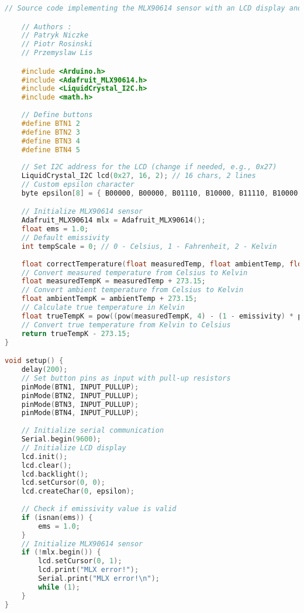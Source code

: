 \begin{lstlisting}[language=C++]
    // Source code implementing the MLX90614 sensor with an LCD display and keypad as a pyrometer using the Arduino platform

    // Authors :
    // Patryk Niczke
    // Piotr Rosinski
    // Przemyslaw Lis

    #include <Arduino.h>
    #include <Adafruit_MLX90614.h>
    #include <LiquidCrystal_I2C.h>
    #include <math.h>
    
    // Define buttons
    #define BTN1 2
    #define BTN2 3
    #define BTN3 4
    #define BTN4 5
    
    // Set I2C address for the LCD (change if needed, e.g., 0x27)
    LiquidCrystal_I2C lcd(0x27, 16, 2); // 16 chars, 2 lines
    // Custom epsilon character
    byte epsilon[8] = { B00000, B00000, B01110, B10000, B11110, B10000, B01110, B00000 };

    // Initialize MLX90614 sensor
    Adafruit_MLX90614 mlx = Adafruit_MLX90614();
    float ems = 1.0;
    // Default emissivity
    int tempScale = 0; // 0 - Celsius, 1 - Fahrenheit, 2 - Kelvin
    
    float correctTemperature(float measuredTemp, float ambientTemp, float emissivity) {
    // Convert measured temperature from Celsius to Kelvin
    float measuredTempK = measuredTemp + 273.15;
    // Convert ambient temperature from Celsius to Kelvin
    float ambientTempK = ambientTemp + 273.15;
    // Calculate true temperature in Kelvin
    float trueTempK = pow((pow(measuredTempK, 4) - (1 - emissivity) * pow(ambientTempK, 4)) / emissivity, 0.25);
    // Convert true temperature from Kelvin to Celsius
    return trueTempK - 273.15;
}

void setup() {
    delay(200);
    // Set button pins as input with pull-up resistors
    pinMode(BTN1, INPUT_PULLUP);
    pinMode(BTN2, INPUT_PULLUP);
    pinMode(BTN3, INPUT_PULLUP);
    pinMode(BTN4, INPUT_PULLUP);
    
    // Initialize serial communication
    Serial.begin(9600);
    // Initialize LCD display
    lcd.init();
    lcd.clear();
    lcd.backlight();
    lcd.setCursor(0, 0);
    lcd.createChar(0, epsilon);
    
    // Check if emissivity value is valid
    if (isnan(ems)) {
        ems = 1.0;
    }
    // Initialize MLX90614 sensor
    if (!mlx.begin()) {
        lcd.setCursor(0, 1);
        lcd.print("MLX error!");
        Serial.print("MLX error!\n");
        while (1);
    }
}


\end{lstlisting}
